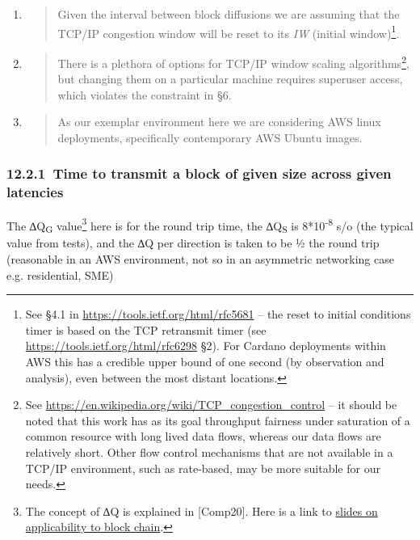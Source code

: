 \documentclass[11pt,a4paper]{article}
\begin{document}
\begin{enumerate}
\def\labelenumi{\arabic{enumi}.}
\item
  \begin{quote}
  Given the interval between block diffusions we are assuming that the
  TCP/IP congestion window will be reset to its \emph{IW} (initial
  window)\footnote{See §4.1 in
    \href{https://tools.ietf.org/html/rfc5681}{{https://tools.ietf.org/html/rfc5681}}
    -- the reset to initial conditions timer is based on the TCP
    retransmit timer (see
    \href{https://tools.ietf.org/html/rfc6298}{{https://tools.ietf.org/html/rfc6298}}
    §2). For Cardano deployments within AWS this has a credible upper
    bound of one second (by observation and analysis), even between the
    most distant locations.}.
  \end{quote}
\item
  \begin{quote}
  There is a plethora of options for TCP/IP window scaling
  algorithms\footnote{See
    \href{https://en.wikipedia.org/wiki/TCP_congestion_control}{{https://en.wikipedia.org/wiki/TCP\_congestion\_control}}
    -- it should be noted that this work has as its goal throughput
    fairness under saturation of a common resource with long lived data
    flows, whereas our data flows are relatively short. Other flow
    control mechanisms that are not available in a TCP/IP environment,
    such as rate-based, may be more suitable for our needs.}, but
  changing them on a particular machine requires superuser access, which
  violates the constraint in §6.
  \end{quote}
\item
  \begin{quote}
  As our exemplar environment here we are considering AWS linux
  deployments, specifically contemporary AWS Ubuntu images.
  \end{quote}
\end{enumerate}

\hypertarget{time-to-transmit-a-block-of-given-size-across-given-latencies}{%
\subsubsection{​12.2.1​~Time to transmit a block of given size across
given
latencies}\label{time-to-transmit-a-block-of-given-size-across-given-latencies}}

The ∆Q\textbar{}\textsubscript{G} value\footnote{The concept of ∆Q is
  explained in {[}Comp20{]}. Here is a link to
  \href{https://www.slideshare.net/pnsol-slides/q-and-blockchain-83943683}{{slides
  on applicability to block chain}}.} here is for the round trip time,
the ∆Q\textbar{}\textsubscript{S} is 8*10\textsuperscript{-8} s/o (the
typical value from tests), and the ∆Q per direction is taken to be ½ the
round trip (reasonable in an AWS environment, not so in an asymmetric
networking case e.g. residential, SME)
\end{document}
